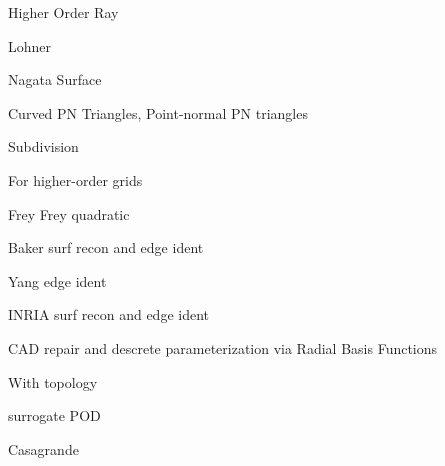 \documentclass{article}
\begin{document}
Higher Order Ray\cite{ray-delany-einstein-jiao-robust-ho-surf-recon-remesh}

Lohner\cite{lohner-regridding-surface}
\cite{kim-takano-nakahashi-adjoint-adapt,kim-nakahashi-adjoint-adapt-viscous}

Nagata Surface \cite{nagata-surface-recon-interp-normal}

Curved PN Triangles,
Point-normal PN triangles\cite{vlachos-curved-pn-triangles}

Subdivision\cite{haimes-imr15-subdivision}

For higher-order grids\cite{unstruct-3d-ho-grid-dg-surf-recon}
\cite{jiao-wang-resonstruct-ho-surf}

Frey\cite{frey-imr9-about-surface-remeshing}
Frey quadratic\cite{dapogny-dobrzynski-frey-3d-adapt-surf-recon}

Baker surf recon and edge ident\cite{baker-imr13}

Yang edge ident\cite{yang-zheng-wang-joint-line-detection-tri}

INRIA surf recon and edge ident\cite{borouchaki-surface-reconstruction}

CAD repair and descrete parameterization via Radial Basis Functions
\cite{cad-repair-discrete-param-rbf}

With topology\cite{lepage-habashi-cad-reconstruction}

surrogate POD\cite{bobrowski-surrogate-geom-pod-adj-opt}

Casagrande\cite{casagrande-phd-para-adapt-recon}
\cite{casagrande-para-adapt-geom-preserve-surf}



\end{document}
